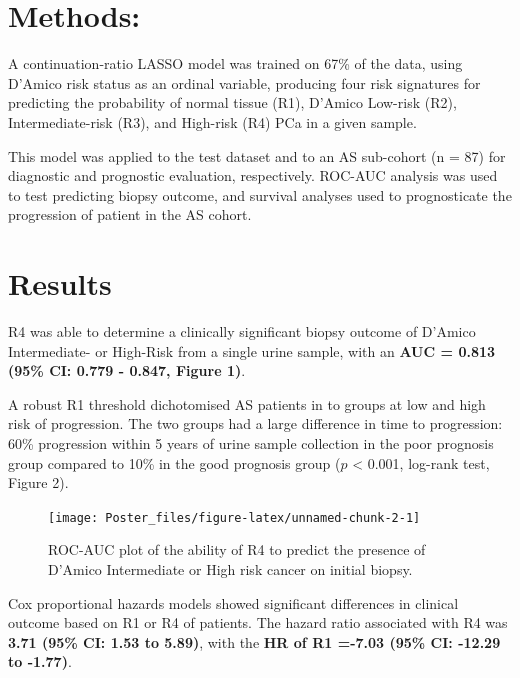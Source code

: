 \documentclass[article,30pt,extrafontsizes]{memoir}
\begin{document}
\begin{flushleft}
\begin{adjmulticols*}{2}{10mm}{10mm}
{\vspace{-25mm}

\hypertarget{methods}{%
\section{Methods:}\label{methods}}

A continuation-ratio LASSO model was trained on 67\% of the data, using
D'Amico risk status as an ordinal variable, producing four risk
signatures for predicting the probability of normal tissue (R1), D'Amico
Low-risk (R2), Intermediate-risk (R3), and High-risk (R4) PCa in a given
sample.

This model was applied to the test dataset and to an AS sub-cohort (n =
87) for diagnostic and prognostic evaluation, respectively. ROC-AUC
analysis was used to test predicting biopsy outcome, and survival
analyses used to prognosticate the progression of patient in the AS
cohort. \vspace{-35mm}

\hypertarget{results}{%
\section{Results}\label{results}}

R4 was able to determine a clinically significant biopsy outcome of
D'Amico Intermediate- or High-Risk from a single urine sample, with an
\textbf{AUC = 0.813 (95\% CI: 0.779 - 0.847, Figure 1)}.

A robust R1 threshold dichotomised AS patients in to groups at low and
high risk of progression. The two groups had a large difference in time
to progression: 60\% progression within 5 years of urine sample
collection in the poor prognosis group compared to 10\% in the good
prognosis group (\(p\) \textless{} 0.001, log-rank test, Figure 2).

\begin{figure}

{\centering \texttt{[image: Poster\_files/figure-latex/unnamed-chunk-2-1]} 

}

\caption{ROC-AUC plot of the ability of R4 to predict the presence of D'Amico Intermediate or High risk cancer on initial biopsy.}\label{fig:unnamed-chunk-2}
\end{figure}
\vspace{-10mm}

Cox proportional hazards models showed significant differences in
clinical outcome based on R1 or R4 of patients. The hazard ratio
associated with R4 was \textbf{3.71 (95\% CI: 1.53 to 5.89)}, with the
\textbf{HR of R1 =-7.03 (95\% CI: -12.29 to -1.77)}.

}
\end{adjmulticols*}
\end{flushleft}
\end{document}
